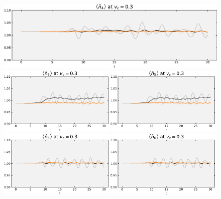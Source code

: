 \begin{figure}[!hbt]
\begin{minipage}[b]{.49\textwidth}
                \includegraphics[trim=0 0 0 -4, clip, width=1.00\textwidth]{graph/occupation/occupation_site_4_vc_03.pdf}
                \includegraphics[trim=0 0 0 -4, clip, width=0.49\textwidth]{graph/occupation/occupation_site_9_vc_03.pdf}
                \includegraphics[trim=0 0 0 -4, clip, width=0.49\textwidth]{graph/occupation/occupation_site_5_vc_03.pdf}
                \includegraphics[trim=0 0 0 -4, clip, width=0.49\textwidth]{graph/occupation/occupation_site_8_vc_03.pdf}
                \includegraphics[trim=0 0 0 -4, clip, width=0.49\textwidth]{graph/occupation/occupation_site_6_vc_03.pdf}

\end{minipage}
\end{figure}
